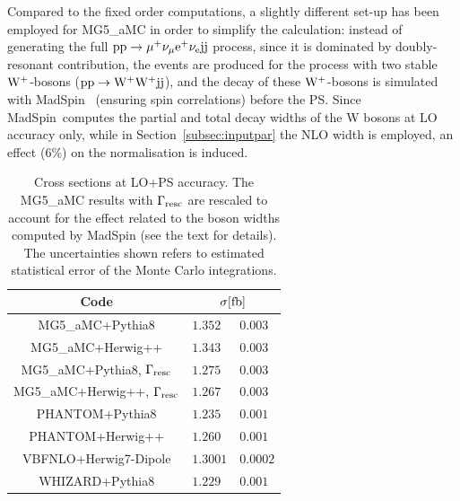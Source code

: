 \documentclass[twocolumn,epjc3]{svjour3} %
\newlength{\width}
\begin{document}
Compared to the fixed order computations, a slightly different set-up has been employed for {\sc MG5\_aMC} in order to simplify the calculation: instead of generating the full
${\rm p}{\rm p}\to\mu^+\nu_\mu{\rm e}^+\nu_{\rm e}{\rm j}{\rm j}$ process, since it is dominated by doubly-resonant contribution, the
events are produced for the process with two stable ${\rm W}^+$-bosons (${\rm p}{\rm p}\to{\rm W^+}{\rm W^+}{\rm j}{\rm j}$), and the decay of these ${\rm W}^+$-bosons
is simulated with {\sc MadSpin}~\cite{Artoisenet:2012st} (ensuring spin correlations) before the PS. Since {\sc MadSpin}\ computes
the partial and total decay widths of the W bosons at LO accuracy only, while in Section~\ref{subsec:inputpar} the NLO width is employed,
an effect ($6\%$) on the normalisation is induced. 

\begin{table}[h!]
    \centering
    \begin{tabular}{c|l@{ $\pm$ }l}
      Code  &  \multicolumn{2}{c}{$\sigma[\rm{fb}]$}  \\
        \hline\hline
        {\sc MG5\_aMC}+{\sc Pythia8}&  $1.352 $ & $0.003$  \\
        {\sc MG5\_aMC}+{\sc Herwig++}&  $1.343 $ & $ 0.003$  \\
        {\sc MG5\_aMC}+{\sc Pythia8}, $\Gamma_{\rm resc}$&  $1.275$ & $0.003$  \\
        {\sc MG5\_aMC}+{\sc Herwig++}, $\Gamma_{\rm resc}$&  $1.267$ & $ 0.003$  \\
        {\sc PHANTOM}+{\sc Pythia8} &  $1.235 $ & $0.001$  \\
        {\sc PHANTOM}+{\sc Herwig++} &  $1.260 $ & $0.001$  \\
        {\sc VBFNLO}+{\sc Herwig7-Dipole} &  $1.3001$ & $0.0002$  \\
        {\sc WHIZARD}+{\sc Pythia8} &  $1.229$ & $0.001$  \\
    \end{tabular}
    \caption{\label{tab:PSratesLO} Cross sections at LO+PS accuracy.
    The {\sc MG5\_aMC} results with $\Gamma_{\rm resc}$
    are rescaled to account for the effect related to the boson widths computed by {\sc MadSpin} (see the text for details).
    The uncertainties shown refers to estimated statistical error of the Monte Carlo integrations.}
\end{table}
\end{document}
